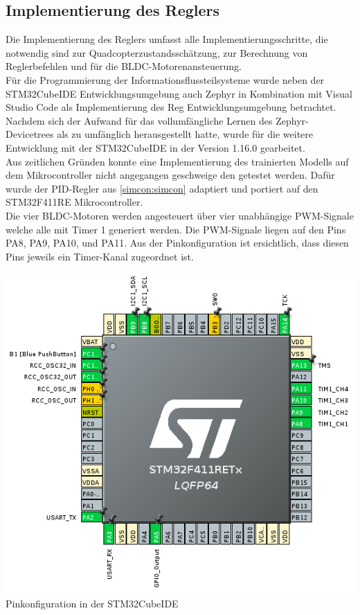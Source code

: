 \subsection{\label{Reglerimplementierung:Reglerimplementierung}Implementierung des Reglers}
Die Implementierung des Reglers umfasst alle Implementierungsschritte, die notwendig sind zur Quadcopterzustandsschätzung, zur Berechnung von Reglerbefehlen und für die BLDC-Motorenansteuerung.\\
Für die Programmierung der Informationsflussteilsysteme wurde neben der STM32CubeIDE Entwicklungsumgebung auch Zephyr in Kombination mit Visual Studio Code als Implementierung des Reg Entwicklungsumgebung betrachtet. Nachdem sich der Aufwand für das vollumfängliche Lernen des Zephyr-Devicetrees als zu umfänglich herausgestellt hatte, wurde für die weitere Entwicklung mit der STM32CubeIDE in der Version 1.16.0 gearbeitet.\\
Aus zeitlichen Gründen konnte eine Implementierung des trainierten Modells auf dem Mikrocontroller nicht angegangen geschweige den getestet werden. Dafür wurde der PID-Regler aus \ref{simcon:simcon} adaptiert und portiert auf den STM32F411RE Mikrocontroller. \\
Die vier BLDC-Motoren werden angesteuert über vier unabhängige PWM-Signale welche alle mit Timer 1 generiert werden. Die PWM-Signale liegen auf den Pins PA8, PA9, PA10, und PA11. Aus der Pinkonfiguration ist ersichtlich, dass diesen Pins jeweils ein Timer-Kanal zugeordnet ist. 
\begin{center}
	\includegraphics[scale=0.5]{../images/0064 Pinbelegung.png}{\\Pinkonfiguration in der STM32CubeIDE}
\end{center}
